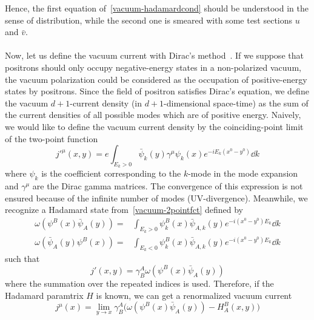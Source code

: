 Hence, the first equation of~\cref{vacuum-hadamardcond} should be understood in the sense of distribution,
while the second one is smeared with some test sections $u$ and $\bar{v}$. \\\\
Now, let us define the vacuum current with Dirac's method~\cite{Dirac1934}.
If we suppose that positrons should only occupy negative-energy states in a non-polarized vacuum, 
the vacuum polarization could be considered as the occupation of positive-energy states by positrons. 
Since the field of positron satisfies Dirac's equation, 
we define the vacuum $d+1$-current density (in $d+1$-dimensional space-time) as the sum of the current densities of all possible modes which are of positive energy. 
Naively, we would like to define the vacuum current density by the coinciding-point limit of the two-point function
\begin{equation}\label{vacuum-2pointfct}
j'^{\mu}(x,y) =  e \int_{E_k > 0} \bar{\psi}_k(y)\gamma^\mu \psi_k(x) e^{- i E_k(x^0 - y^0)} \dd k
\end{equation}
where $\psi_k$ is the coefficient corresponding to the $k$-mode in the mode expansion and $\gamma^\mu$ are the Dirac gamma matrices.
The convergence of this expression is not ensured because of the infinite number of modes (UV-divergence).
Meanwhile, we recognize a Hadamard state from~\cref{vacuum-2pointfct} defined by 
\begin{equation*}
\begin{split}
\omega(\psi^B(x)\bar{\psi}_A(y)) = & \int_{E_k >0} \psi_k^B(x)\bar{\psi}_{A,k}(y)e^{-i(x^0-y^0)E_k} \dd k \\
\omega(\bar{\psi}_A(y)\psi^B(x)) = & \int_{E_k <0} \psi_k^B(x)\bar{\psi}_{A,k}(y)e^{-i(x^0-y^0)E_k} \dd k 
\end{split}
\end{equation*}
such that 
\begin{equation*}
j'(x,y) = \gamma^A_B \omega(\psi^B(x)\bar{\psi}_A(y)) 
\end{equation*}
where the summation over the repeated indices is used.
Therefore, if the Hadamard paramtrix $H$ is known, we can get a renormalized vacuum current
\begin{equation*}
j^\mu(x) = \lim_{y \rightarrow x} \gamma^A_B \big(
\omega(\psi^B(x)\bar{\psi}_A(y)) - H^B_A (x, y)\big)
\end{equation*}
%
